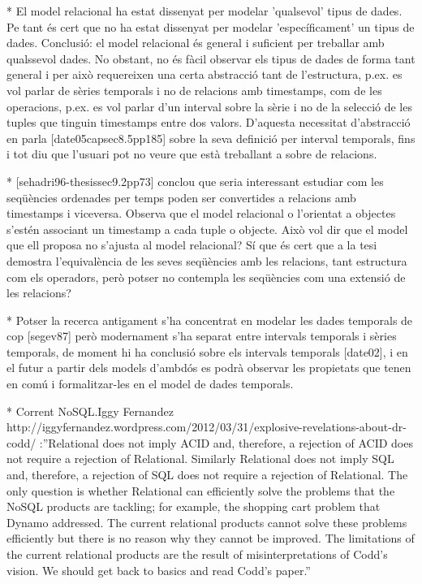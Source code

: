 * El model relacional ha estat dissenyat per modelar 'qualsevol' tipus de dades. Pe tant és cert que no ha estat dissenyat per modelar 'específicament' un tipus de dades. Conclusió: el model relacional és general i suficient per treballar amb qualssevol dades. No obstant, no és fàcil observar els tipus de dades de forma tant general i per això requereixen una certa abstracció tant de l'estructura, p.ex. es vol parlar de sèries temporals i no de relacions amb timestamps, com de les operacions, p.ex. es vol parlar d'un interval sobre la sèrie i no de la selecció de les tuples que tinguin timestamps entre dos valors. D'aquesta necessitat d'abstracció en parla [date05capsec8.5pp185] sobre la seva definició per interval temporals, fins i tot diu que l'usuari pot no veure que està treballant a sobre de relacions.


* [sehadri96-thesissec9.2pp73] conclou que seria interessant estudiar com les seqüències ordenades per temps poden ser convertides a relacions amb timestamps i viceversa. Observa que el model relacional o l'orientat a objectes s'estén associant un timestamp a cada tuple o objecte. Això vol dir que el model que ell proposa no s'ajusta al model relacional? Sí que és cert que a la tesi demostra l'equivalència de les seves seqüències amb les relacions, tant estructura com els operadors, però potser no contempla les seqüències com una extensió de les relacions?


* Potser la recerca antigament s'ha concentrat en modelar les dades temporals de cop [segev87] però modernament s'ha separat entre intervals temporals i sèries temporals, de moment hi ha conclusió sobre els intervals temporals [date02], i en el futur a partir dels models d'ambdós es podrà observar les propietats que tenen en comú i formalitzar-les en el model de dades temporals.





* Corrent NoSQL.Iggy Fernandez http://iggyfernandez.wordpress.com/2012/03/31/explosive-revelations-about-dr-codd/ :''Relational does not imply ACID and, therefore, a rejection of ACID does not require a rejection of Relational. Similarly Relational does not imply SQL and, therefore, a rejection of SQL does not require a rejection of Relational. The only question is whether Relational can efficiently solve the problems that the NoSQL products are tackling; for example, the shopping cart problem that Dynamo addressed. The current relational products cannot solve these problems efficiently but there is no reason why they cannot be improved. The limitations of the current relational products are the result of misinterpretations of Codd’s vision. We should get back to basics and read Codd’s paper.''




